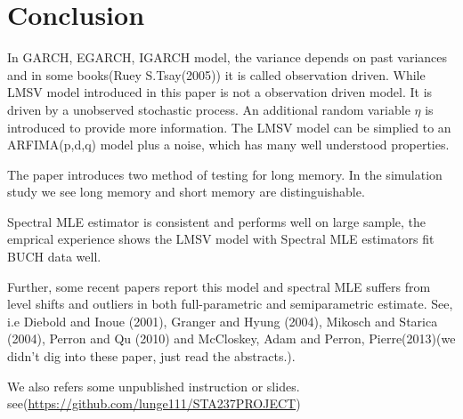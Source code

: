 \documentclass[10pt,a4paper]{article}
\begin{document}
\section{Conclusion}
In GARCH, EGARCH, IGARCH model, the variance depends on past variances and  in some books(Ruey S.Tsay(2005))\cite{tsay2005analysis} it is called observation driven. While LMSV model introduced in this paper is not a observation driven model. It is driven by a unobserved stochastic process. An additional random variable $\eta$ is introduced to provide more information. The LMSV model can be simplied to an ARFIMA(p,d,q) model plus a noise, which has many well understood properties.

The paper introduces two method of testing for long memory. In the simulation study we see long memory and short memory are distinguishable. 

Spectral MLE estimator is consistent and performs well on large sample, the emprical experience shows the LMSV model with Spectral MLE estimators fit BUCH data well.

Further, some recent papers report this model and spectral MLE suffers from level shifts and outliers in both full-parametric and semiparametric estimate. See, i.e Diebold and Inoue (2001)\cite{diebold2001long}, Granger and Hyung (2004)\cite{granger2004occasional},
Mikosch and Starica (2004)\cite{mikosch2004nonstationarities}, Perron and Qu (2010)\cite{shumway2000time} and McCloskey, Adam and Perron, Pierre(2013)\cite{mccloskey2013memory}(we didn't dig into these paper, just read the abstracts.).

\renewcommand\refname{Reference}

 
We also refers some unpublished instruction or slides. see(\url{https://github.com/lunge111/STA237PROJECT})
\end{document}
